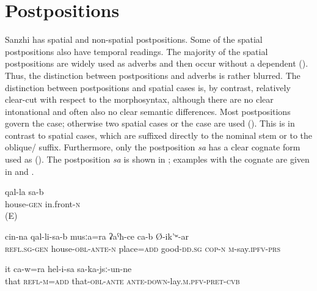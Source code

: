 \chapter{Postpositions}\label{cpt:postpositions}

Sanzhi has spatial and non-spatial postpositions. Some of the spatial postpositions also have temporal readings. The majority of the spatial postpositions are widely used as adverbs and then occur without a dependent  (). Thus, the distinction between postpositions and adverbs is rather blurred. The distinction between postpositions and spatial cases is, by contrast, relatively clear-cut with respect to the morphosyntax, although there are no clear intonational and often also no clear semantic differences. Most postpositions govern the  case; otherwise two spatial cases or the  case are used (). This is in contrast to spatial cases, which are suffixed directly to the nominal stem or to the oblique/ suffix. Furthermore, only the postposition \textit{sa} has a clear cognate form used as  (). The postposition \textit{sa} is shown in ; examples with the cognate  are given in  and . 

\begin{exe}
	\ex	
	\begin{xlist}
			\ex	\label{in front of the house}
		\gll	qal-la	sa-b \\
			house-\textsc{gen}	in.front-\textsc{n}\\
		\glt	{} (E)
		
		\ex	\label{In front of his house there is also a good area, he says}
		\gll	cin-na	qal-li-sa-b	musːa=ra	ʡaˁħ-ce	ca-b Ø-ik'ʷ-ar\\
			\textsc{refl}.\textsc{sg}-\textsc{gen}	house-\textsc{obl}-\textsc{ante}-\textsc{n}	place=\textsc{add} good-\textsc{dd}.\textsc{sg} \textsc{cop-n}	\textsc{m}-say.\textsc{ipfv}-\textsc{prs}\\
		\glt	{}

		\ex	\label{he himself also slept in front of it}
		\gll	it	ca-w=ra	hel-i-sa	sa-ka-jsː-un-ne\\
			that	\textsc{refl}-\textsc{m}=\textsc{add}	that-\textsc{obl}-\textsc{ante}	\textsc{ante-down}-lay.\textsc{m}.\textsc{pfv}-\textsc{pret}-\textsc{cvb}\\
		\glt	{}
	\end{xlist}
\end{exe}

